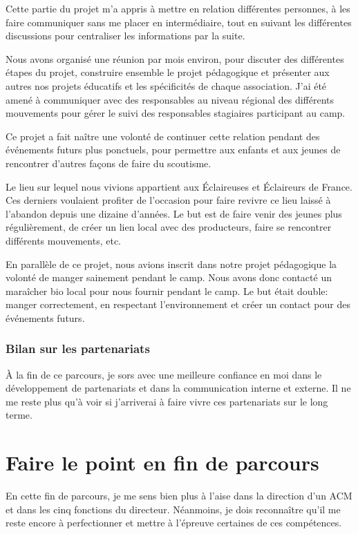 \documentclass[titlepage,11pt,a4paper]{article}
\begin{document}
Cette partie du projet m'a appris à mettre en relation différentes personnes, à les faire
communiquer sans me placer en intermédiaire, tout en suivant les différentes discussions
pour centraliser les informations par la suite.

Nous avons organisé une réunion par mois environ, pour discuter des différentes étapes du
projet, construire ensemble le projet pédagogique et présenter aux autres nos projets
éducatifs et les spécificités de chaque association. J'ai été amené à communiquer avec des
responsables au niveau régional des différents mouvements pour gérer le suivi des
responsables stagiaires participant au camp.

Ce projet a fait naître une volonté de continuer cette relation pendant des événements
futurs plus ponctuels, pour permettre aux enfants et aux jeunes de rencontrer d'autres
façons de faire du scoutisme.

Le lieu sur lequel nous vivions appartient aux Éclaireuses et Éclaireurs de France. Ces
derniers voulaient profiter de l'occasion pour faire revivre ce lieu laissé à l'abandon
depuis une dizaine d'années. Le but est de faire venir des jeunes plus régulièrement, de
créer un lien local avec des producteurs, faire se rencontrer différents mouvements, etc.

En parallèle de ce projet, nous avions inscrit dans notre projet pédagogique la volonté de
manger sainement pendant le camp. Nous avons donc contacté un maraîcher bio local pour nous
fournir pendant le camp. Le but était double: manger correctement, en respectant
l'environnement et créer un contact pour des événements futurs.

\subsubsection{Bilan sur les partenariats}

À la fin de ce parcours, je sors avec une meilleure confiance en moi dans le développement
de partenariats et dans la communication interne et externe. Il ne me reste plus qu'à voir
si j'arriverai à faire vivre ces partenariats sur le long terme.

\section{Faire le point en fin de parcours}

En cette fin de parcours, je me sens bien plus à l'aise dans la direction d'un ACM et dans
les cinq fonctions du directeur. Néanmoins, je dois reconnaître qu'il me reste encore à
perfectionner et mettre à l'épreuve certaines de ces compétences.
\end{document}
